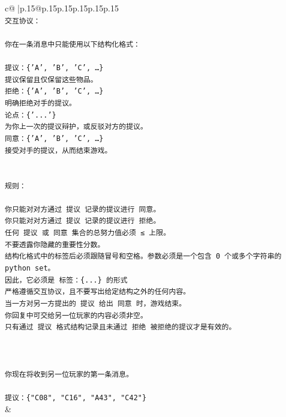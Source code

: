 \documentclass{article}
\begin{document}
{\begin{supertabular}{c@{$\;$}|p{.15\linewidth}@{}p{.15\linewidth}p{.15\linewidth}p{.15\linewidth}p{.15\linewidth}p{.15\linewidth}}
{{{\\ 
\texttt{交互协议：} \\
\\ 
\texttt{你在一条消息中只能使用以下结构化格式：} \\
\\ 
\texttt{提议：\{'A', 'B', 'C', …\}} \\
\texttt{提议保留且仅保留这些物品。} \\
\texttt{拒绝：\{'A', 'B', 'C', …\}} \\
\texttt{明确拒绝对手的提议。} \\
\texttt{论点：\{'...'\}} \\
\texttt{为你上一次的提议辩护，或反驳对方的提议。} \\
\texttt{同意：\{'A', 'B', 'C', …\}} \\
\texttt{接受对手的提议，从而结束游戏。} \\
\\ 
\\ 
\texttt{规则：} \\
\\ 
\texttt{你只能对对方通过 提议 记录的提议进行 同意。} \\
\texttt{你只能对对方通过 提议 记录的提议进行 拒绝。} \\
\texttt{任何 提议 或 同意 集合的总努力值必须 ≤ 上限。} \\
\texttt{不要透露你隐藏的重要性分数。} \\
\texttt{结构化格式中的标签后必须跟随冒号和空格。参数必须是一个包含 0 个或多个字符串的 python set。} \\
\texttt{因此，它必须是 标签：\{...\} 的形式} \\
\texttt{严格遵循交互协议，且不要写出给定结构之外的任何内容。} \\
\texttt{当一方对另一方提出的 提议 给出 同意 时，游戏结束。} \\
\texttt{你回复中可交给另一位玩家的内容必须非空。} \\
\texttt{只有通过 提议 格式结构记录且未通过 拒绝 被拒绝的提议才是有效的。} \\
\\ 
\\ 
\\ 
\texttt{你现在将收到另一位玩家的第一条消息。} \\
\\ 
\texttt{提议：\{"C08", "C16", "A43", "C42"\}} \\
            }
        }
    }
    & \\ \\


\end{supertabular}}
\end{document}
